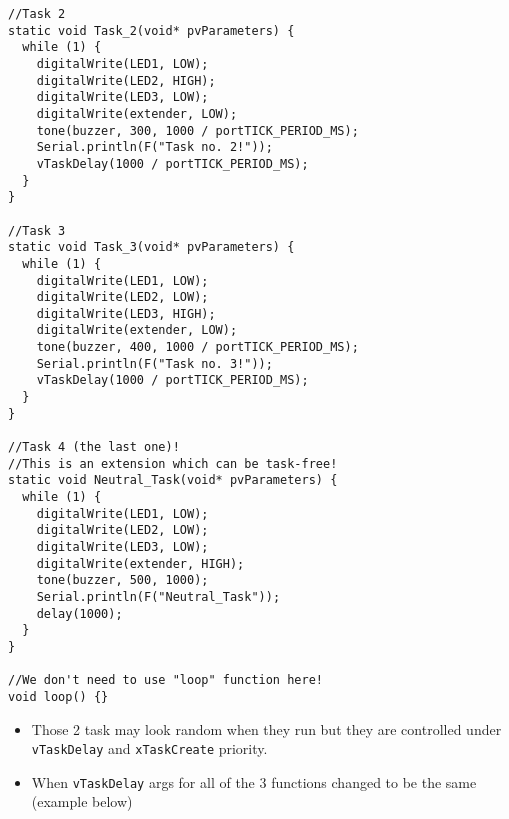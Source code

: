 \documentclass{article}
\begin{document}
\begin{lstlisting}[style=cpp]
//Task 2
static void Task_2(void* pvParameters) {
  while (1) {
    digitalWrite(LED1, LOW);
    digitalWrite(LED2, HIGH);
    digitalWrite(LED3, LOW);
    digitalWrite(extender, LOW);
    tone(buzzer, 300, 1000 / portTICK_PERIOD_MS);
    Serial.println(F("Task no. 2!"));
    vTaskDelay(1000 / portTICK_PERIOD_MS);
  }
}

//Task 3
static void Task_3(void* pvParameters) {
  while (1) {
    digitalWrite(LED1, LOW);
    digitalWrite(LED2, LOW);
    digitalWrite(LED3, HIGH);
    digitalWrite(extender, LOW);
    tone(buzzer, 400, 1000 / portTICK_PERIOD_MS);
    Serial.println(F("Task no. 3!"));
    vTaskDelay(1000 / portTICK_PERIOD_MS);
  }
}

//Task 4 (the last one)!
//This is an extension which can be task-free!
static void Neutral_Task(void* pvParameters) {
  while (1) {
    digitalWrite(LED1, LOW);
    digitalWrite(LED2, LOW);
    digitalWrite(LED3, LOW);
    digitalWrite(extender, HIGH);
    tone(buzzer, 500, 1000);
    Serial.println(F("Neutral_Task"));
    delay(1000);
  }
}

//We don't need to use "loop" function here!
void loop() {}
\end{lstlisting}
\begin{itemize}
    \item Those 2 task may look random when they run but they are controlled under \texttt{vTaskDelay} and \texttt{xTaskCreate} priority.
    \item When \texttt{vTaskDelay} args for all of the 3 functions changed to be the same (example below)
\end{itemize}
\end{document}
